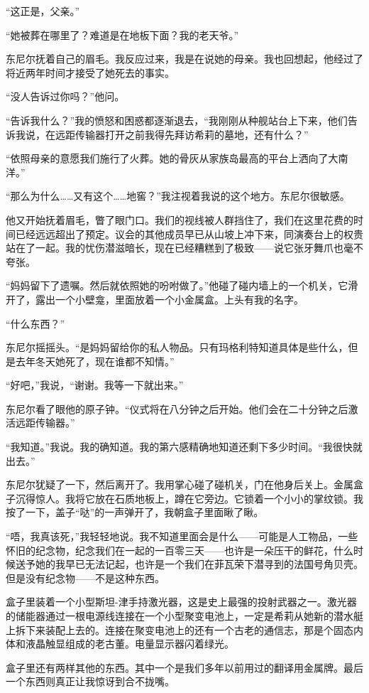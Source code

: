 \documentclass[AutoFakeBold=true]{book}
\begin{document}
``这正是，父亲。''

``她被葬在哪里了？难道是在地板下面？我的老天爷。''

东尼尔抚着自己的眉毛。我反应过来，我是在说她的母亲。我也回想起，他经过了将近两年时间才接受了她死去的事实。

``没人告诉过你吗？''他问。

``告诉我什么？''我的愤怒和困惑都逐渐退去，``我刚刚从种舰站台上下来，他们告诉我说，在远距传输器打开之前我得先拜访希莉的墓地，还有什么？''

``依照母亲的意愿我们施行了火葬。她的骨灰从家族岛最高的平台上洒向了大南洋。''

``那么为什么……又有这个……{\kaishu 地窖}？''我注视着我说的这个地方。东尼尔很敏感。

他又开始抚着眉毛，瞥了眼门口。我们的视线被人群挡住了，我们在这里花费的时间已经远远超出了预定。议会的其他成员早已从山坡上冲下来，同演奏台上的权贵站在了一起。我的忧伤潜滋暗长，现在已经糟糕到了极致——说它张牙舞爪也毫不夸张。

``妈妈留下了遗嘱。然后就依照她的吩咐做了。''他碰了碰内墙上的一个机关，它滑开了，露出一个小壁龛，里面放着一个小金属盒。上头有我的名字。

``什么东西？''

东尼尔摇摇头。``是妈妈留给你的私人物品。只有玛格利特知道具体是些什么，但是去年冬天她死了，现在谁都不知情。''

``好吧，''我说，``谢谢。我等一下就出来。''

东尼尔看了眼他的原子钟。``仪式将在八分钟之后开始。他们会在二十分钟之后激活远距传输器。''

``我知道。''我说。我的确知道。我的第六感精确地知道还剩下多少时间。``我很快就出去。''

东尼尔犹疑了一下，然后离开了。我用掌心碰了碰机关，门在他身后关上。金属盒子沉得惊人。我将它放在石质地板上，蹲在它旁边。它锁着一个小小的掌纹锁。我按了一下，盖子``哒''的一声弹开了，我朝盒子里面瞅了瞅。

``唔，我真该死，''我轻轻地说。我不知道里面会是什么——可能是人工物品，一些怀旧的纪念物，纪念我们在一起的一百零三天——也许是一朵压干的鲜花，什么时候送予她的我早已无法记起，也许是一个我们在菲瓦荣下潜寻到的法国号角贝壳。但是没有纪念物——不是这种东西。

盒子里装着一个小型斯坦-津手持激光器，这是史上最强的投射武器之一。激光器的储能器通过一根电源线连接在一个小型聚变电池上，一定是希莉从她新的潜水艇上拆下来装配上去的。连接在聚变电池上的还有一个古老的通信志，那是个固态内体和液晶触显组成的老古董。电量显示器闪着绿光。

盒子里还有两样其他的东西。其中一个是我们多年以前用过的翻译用金属牌。最后一个东西则真正让我惊讶到合不拢嘴。
\end{document}
